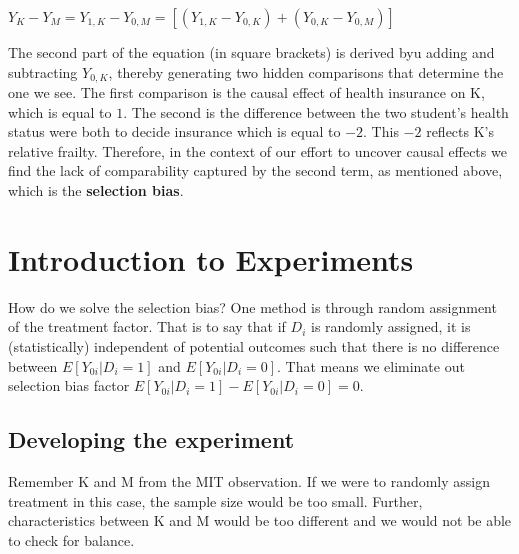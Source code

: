 \documentclass[12pt, letterpaper]{article}
\begin{document}
{\begin{center}
	$Y_K - Y_M = Y_{1,K} - Y_{0,M} = [(Y_{1,K} - Y_{0,K}) + (Y_{0,K} - Y_{0,M})]$
\end{center}
The second part of the equation (in square brackets) is derived byu adding and subtracting $Y_{0,K}$, thereby generating two hidden comparisons that determine the one we see. The first comparison is the causal effect of health insurance on K, which is equal to $1$. The second is the difference between the two student's health status were both to decide insurance which is equal to $-2$. This $-2$ reflects K's relative frailty. Therefore, in the context of our effort to uncover causal effects we find the lack of comparability captured by the second term, as mentioned above, which is the \textbf{selection bias}.

\newpage
\section{Introduction to Experiments}
How do we solve the selection bias? One method is through random assignment of the treatment factor. That is to say that if $D_i$ is randomly assigned, it is (statistically) independent of potential outcomes such that there is no difference between $E[Y_{0i}|D_{i}=1]$ and $E[Y_{0i}|D_{i}=0]$. That means we eliminate out selection bias factor $E[Y_{0i}|D_i=1]-E[Y_{0i}|D_i=0]=0$.

\subsection{Developing the experiment}
Remember K and M from the MIT observation. If we were to randomly assign treatment in this case, the sample size would be too small. Further, characteristics between K and M would be too different and we would not be able to check for balance.

}
\end{document}

